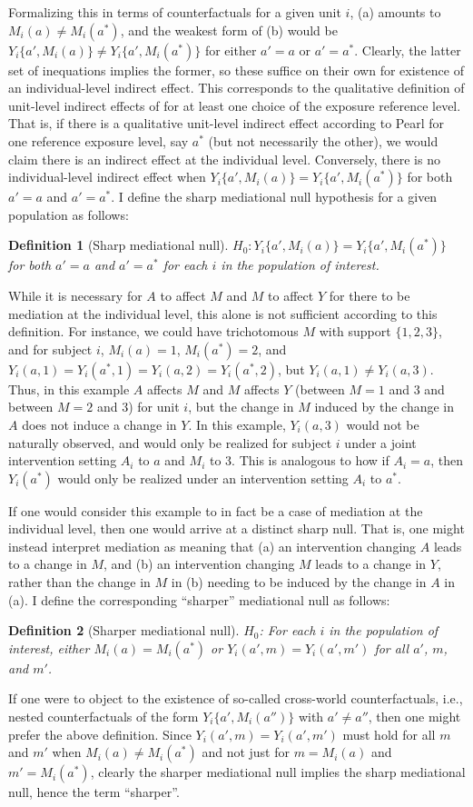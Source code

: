 \documentclass[12pt]{article}
\newtheorem{definition}{Definition}
\begin{document}
Formalizing this in terms of counterfactuals for a given unit $i$, (a) amounts to $M_i(a)\neq M_i(a^*)$, and the weakest form of (b) would be $Y_i\{a',M_i(a)\}\neq Y_i\{a',M_i(a^*)\}$ for either $a'=a$ or $a'=a^*$. Clearly, the latter set of inequations implies the former, so these suffice on their own for existence of an individual-level indirect effect. This corresponds to the qualitative definition of unit-level indirect effects of \cite{pearl2001direct} for at least one choice of the exposure reference level. That is, if there is a qualitative unit-level indirect effect according to Pearl for one reference exposure level, say $a^*$ (but not necessarily the other), we would claim there is an indirect effect at the individual level. Conversely, there is no individual-level indirect effect when $Y_i\{a',M_i(a)\} = Y_i\{a',M_i(a^*)\}$ for both $a'=a$ and $a'=a^*$. I define the sharp mediational null hypothesis for a given population as follows:
\begin{definition}[Sharp mediational null]
    $H_0: Y_i\{a',M_i(a)\} = Y_i\{a',M_i(a^*)\}$ for both $a'=a$ and $a'=a^*$ for each $i$ in the population of interest.
\end{definition}
While it is necessary for $A$ to affect $M$ and $M$ to affect $Y$ for there to be mediation at the individual level, this alone is not sufficient according to this definition. For instance, we could have trichotomous $M$ with support $\{1,2,3\}$, and for subject $i$, $M_i(a)=1$, $M_i(a^*)=2$, and $Y_i(a,1)=Y_i(a^*,1)=Y_i(a,2)=Y_i(a^*,2)$, but $Y_i(a,1)\neq Y_i(a,3)$. Thus, in this example $A$ affects $M$ and $M$ affects $Y$ (between $M=1$ and $3$ and between $M=2$ and $3$) for unit $i$, but the change in $M$ induced by the change in $A$ does not induce a change in $Y$. In this example, $Y_i(a,3)$ would not be naturally observed, and would only be realized for subject $i$ under a joint intervention setting $A_i$ to $a$ and $M_i$ to 3. This is analogous to how if $A_i=a$, then $Y_i(a^*)$ would only be realized under an intervention setting $A_i$ to $a^*$. 

If one would consider this example to in fact be a case of mediation at the individual level, then one would arrive at a distinct sharp null. That is, one might instead interpret mediation as meaning that (a) an intervention changing $A$ leads to a change in $M$, and (b) an intervention changing $M$ leads to a change in $Y$, rather than the change in $M$ in (b) needing to be induced by the change in $A$ in (a). I define the corresponding ``sharper'' mediational null as follows:
\begin{definition}[Sharper mediational null]
    $H_0$: For each $i$ in the population of interest, either $M_i(a)=M_i(a^*)$ or $Y_i(a',m) = Y_i(a',m')$ for all $a'$, $m$, and $m'$.
\end{definition}
If one were to object to the existence of so-called cross-world counterfactuals, i.e., nested counterfactuals of the form $Y_i\{a',M_i(a'')\}$ with $a'\neq a''$, then one might prefer the above definition. Since $Y_i(a',m) = Y_i(a',m')$ must hold for all $m$ and $m'$ when $M_i(a)\neq M_i(a^*)$ and not just for $m=M_i(a)$ and $m'=M_i(a^*)$, clearly the sharper mediational null implies the sharp mediational null, hence the term ``sharper''.
\end{document}
